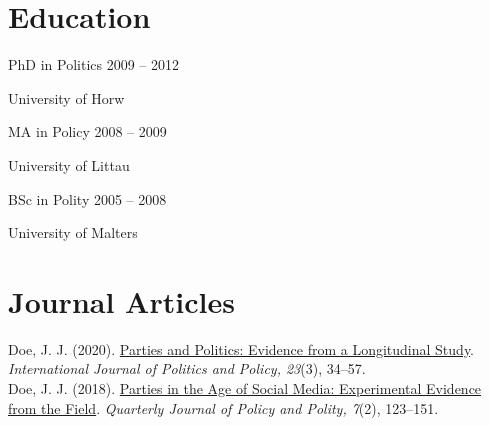 \documentclass{resuls_cv}
\begin{document}
\section{Education}

PhD in Politics \hfill 2009 -- 2012
\begin{innerlist}
	\item[] University of Horw
\end{innerlist}

\vspace{.1in}

MA in Policy \hfill 2008 -- 2009
\begin{innerlist}
	\item[] University of Littau
\end{innerlist}

\vspace{.1in}

BSc in Polity \hfill 2005 -- 2008
\begin{innerlist}
	\item[] University of Malters
\end{innerlist}

\section{Journal Articles}


Doe, J. J. (2020). \href{https://janejdoe.netlify.app/files/jjd_publication2020.pdf}{Parties and Politics: Evidence from a Longitudinal Study}. \textit{International Journal of Politics and Policy, 23}(3), 34--57. \\

Doe, J. J. (2018). \href{https://janejdoe.netlify.app/files/jjd_publication2018.pdf}{Parties in the Age of Social Media: Experimental Evidence from the Field}. \textit{Quarterly Journal of Policy and Polity, 7}(2), 123--151.
\end{document}
